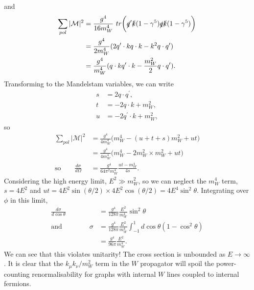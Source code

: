 \documentclass[a4paper,12pt]{article}
\begin{document}
and
\begin{equation}
\begin{split}
    \sum_{pol}|\mathcal{M}|^2 &= \frac{g^4}{16 m_W^4}\ tr\bigg(\slashed{q}^\prime \slashed{k}(1-\gamma^5)\slashed{q}\slashed{k}(1-\gamma^5)\bigg) \\
    & = \frac{g^4}{2m_W^4}(2q^\prime \cdot k q \cdot k - k^2 q \cdot q^\prime) \\
    & = \frac{g^4}{m_W^4} (q \cdot k q^\prime \cdot k - \frac{m_W^2}{2}q \cdot q^\prime).
\end{split}
\end{equation} 
Transforming to the Mandelstam variables, we can write
\begin{equation}
\begin{split}
s &= 2 q \cdot q^\prime, \\
t &= - 2 q \cdot k + m_W^2, \\
u &= - 2 q^\prime \cdot k + m_W^2,
\end{split}
\end{equation}
so
\begin{equation}
\begin{split}
    \sum_{pol}|\mathcal{M}|^2 &= \frac{g^4}{4m_W^4} \big(m_W^4 - (u + t + s)m_W^2 + ut\big)\\
    &= \frac{g^4}{4m_W^4} \big(m_W^4 - 2m_W^2 \times m_W^2 + ut\big)\\
 \text{so} \qquad   \frac{d\sigma}{d\Omega} &= \frac{g^4}{64\pi^2m_W^4}\frac{ut-m_W^4}{4s}.
\end{split}
\end{equation}
Considering the high energy limit, $E^2 \gg m_W^2$, so we can neglect the $m_W^4$ term, $s=4E^2$ and $ut = 4E^2\sin(\theta/2)\times 4E^2\cos(\theta/2) = 4E^4\sin^2\theta$. Integrating over $\phi$ in this limit,
\begin{equation}
\begin{split}
\frac{d\sigma}{d\cos\theta} &= \frac{g^4}{128\pi}\frac{E^2}{m_W^4}\sin^2\theta \\
\text{and} \qquad \qquad \sigma &= \frac{g^4}{128\pi}\frac{E^2}{m_W^4} \int_{-1}^1 d\cos\theta (1-\cos^2\theta) \\
&= \frac{g^4}{96\pi}\frac{E^2}{m_W^4}. 
\end{split}
\end{equation}
We can see that this violates unitarity! The cross section is unbounded as $E \to \infty$. It is clear that the $k_\mu k_\nu/m_W^2$ term in the $W$ propagator will spoil the power-counting renormalisability for graphs with internal $W$ lines coupled to internal fermions. 
\end{document}
